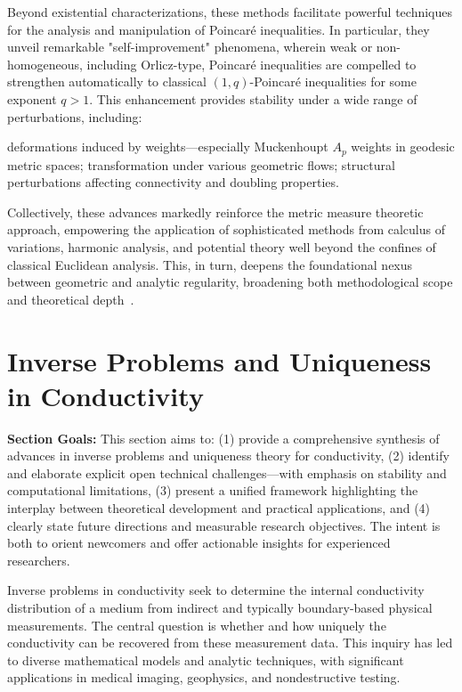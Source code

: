 \documentclass[sigconf]{acmart}
\begin{document}
Beyond existential characterizations, these methods facilitate powerful techniques for the analysis and manipulation of Poincaré inequalities. In particular, they unveil remarkable "self-improvement" phenomena, wherein weak or non-homogeneous, including Orlicz-type, Poincaré inequalities are compelled to strengthen automatically to classical $(1, q)$-Poincaré inequalities for some exponent $q > 1$. This enhancement provides stability under a wide range of perturbations, including:

deformations induced by weights—especially Muckenhoupt $A_p$ weights in geodesic metric spaces;
transformation under various geometric flows;
structural perturbations affecting connectivity and doubling properties.

Collectively, these advances markedly reinforce the metric measure theoretic approach, empowering the application of sophisticated methods from calculus of variations, harmonic analysis, and potential theory well beyond the confines of classical Euclidean analysis. This, in turn, deepens the foundational nexus between geometric and analytic regularity, broadening both methodological scope and theoretical depth~\cite{ref93}.

\section{Inverse Problems and Uniqueness in Conductivity}

\textbf{Section Goals:} This section aims to: (1) provide a comprehensive synthesis of advances in inverse problems and uniqueness theory for conductivity, (2) identify and elaborate explicit open technical challenges---with emphasis on stability and computational limitations, (3) present a unified framework highlighting the interplay between theoretical development and practical applications, and (4) clearly state future directions and measurable research objectives. The intent is both to orient newcomers and offer actionable insights for experienced researchers.

Inverse problems in conductivity seek to determine the internal conductivity distribution of a medium from indirect and typically boundary-based physical measurements. The central question is whether and how uniquely the conductivity can be recovered from these measurement data. This inquiry has led to diverse mathematical models and analytic techniques, with significant applications in medical imaging, geophysics, and nondestructive testing.
\end{document}
